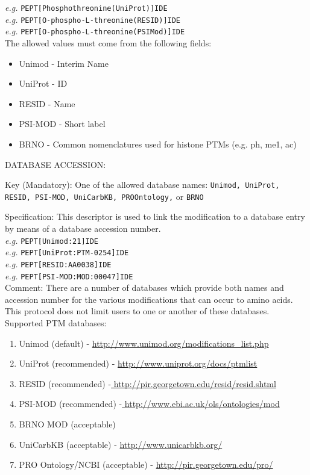 \indent \textit{e.g.} \texttt{PEPT[Phosphothreonine(UniProt)]IDE} \\
\indent \textit{e.g.} \texttt{PEPT[O-phospho-L-threonine(RESID)]IDE} \\
\indent \textit{e.g.} \texttt{PEPT[O-phospho-L-threonine(PSIMod)]IDE} \\

\noindent The allowed values must come from the following fields:
\begin{itemize}
\item Unimod - Interim Name
\item UniProt - ID
\item RESID - Name
\item PSI-MOD - Short label
\item BRNO - Common nomenclatures used for histone PTMs (e.g. ph, me1, ac)
\\
\end{itemize}

\noindent \large{DATABASE ACCESSION:}

Key (Mandatory): One of the allowed database names: \texttt{Unimod, UniProt, RESID, PSI-MOD, UniCarbKB, PROOntology,} or \texttt{BRNO}

Specification: This descriptor is used to link the modification to a database entry by means of a database accession number.
\\

\indent \textit{e.g.} \texttt{PEPT[Unimod:21]IDE} \\
\indent \textit{e.g.} \texttt{PEPT[UniProt:PTM-0254]IDE} \\
\indent \textit{e.g.} \texttt{PEPT[RESID:AA0038]IDE} \\
\indent \textit{e.g.} \texttt{PEPT[PSI-MOD:MOD:00047]IDE} \\

Comment: There are a number of databases which provide both names and accession number for the various modifications that can occur to amino acids. This protocol does not limit users to one or another of these databases.
\\

\noindent Supported PTM databases:
\begin{enumerate}
\item Unimod (default) - \url{http://www.unimod.org/modifications_list.php}
\item UniProt (recommended) - \url{http://www.uniprot.org/docs/ptmlist}
\item RESID (recommended) -\url{ http://pir.georgetown.edu/resid/resid.shtml}
\item PSI-MOD (recommended) -\url{ http://www.ebi.ac.uk/ols/ontologies/mod}
\item BRNO MOD (acceptable)
\item UniCarbKB (acceptable) - \url{http://www.unicarbkb.org/}
\item PRO Ontology/NCBI  (acceptable) -  \url{http://pir.georgetown.edu/pro/}
\\
\end{enumerate}

